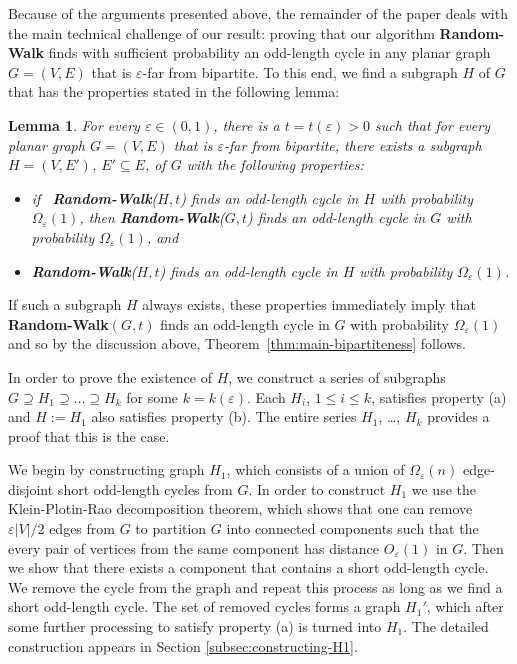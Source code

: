 \documentclass[11pt]{article}
\newtheorem{lemma}[theorem]{Lemma}
\newcommand{\eps}{\ensuremath{\epsilon}}
\def\epsilon{\ensuremath{\varepsilon}}
\newcommand{\RW}{{\bf Random-Walk}}
\begin{document}
Because of the arguments presented above, the remainder of the paper deals with the main technical challenge of our result: proving that our algorithm \RW{} finds with sufficient probability an odd-length cycle in any planar graph $G=(V,E)$ that is $\eps$-far from bipartite. To this end, we find a subgraph $H$ of $G$ that has the properties stated in the following lemma:

\begin{lemma}
\label{lemma:ExistenceOfH}
For every $\epsilon \in (0,1)$, there is a $t=t(\epsilon)>0$ such that
for every planar graph $G=(V,E)$ that is $\epsilon$-far from bipartite,
there exists a subgraph $H=(V,E')$, $E'\subseteq E$, of $G$ with the following properties:
\begin{itemize}
\item[(a)] if \ \RW{($H,t$)} finds an odd-length cycle in $H$ with probability $\Omega_{\eps}(1)$, then \RW{($G,t$)} finds an odd-length cycle in $G$ with probability $\Omega_{\eps}(1)$, and
\item[(b)] \RW{($H,t$)} finds an odd-length cycle in $H$ with probability $\Omega_{\eps}(1)$.
\end{itemize}
\end{lemma}

If such a subgraph $H$ always exists, these properties immediately imply that \RW{$(G,t)$} finds an odd-length cycle in $G$ with probability $\Omega_{\eps}(1)$ and so by the discussion above, Theorem~\ref{thm:main-bipartiteness} follows.

In order to prove the existence of $H$, we construct a series of subgraphs $G \supseteq H_1 \supseteq \dots \supseteq H_k$ for some $k=k(\epsilon)$. Each $H_i$, $1 \le i \le k$, satisfies property (a) and $H:=H_1$ also satisfies property (b). The entire series $H_1$, \dots, $H_k$ provides a proof that this is the case.

We begin by constructing graph $H_1$, which consists of a union of $\Omega_{\eps}(n)$ edge-disjoint short odd-length cycles from $G$. In order to construct $H_1$ we use the Klein-Plotin-Rao decomposition theorem, which shows that one can remove $\epsilon |V|/2$ edges from $G$ to partition $G$ into connected components such that the every pair of vertices from the same component has distance $O_{\eps}(1)$ in $G$. Then we show that there exists a component that contains a short odd-length cycle. We remove the cycle from the graph and repeat this process as long as we find a short odd-length cycle. The set of removed cycles forms a graph $H_1'$, which after some further processing to satisfy property (a) is turned into $H_1$. The detailed construction appears in Section \ref{subsec:constructing-H1}.
\end{document}
